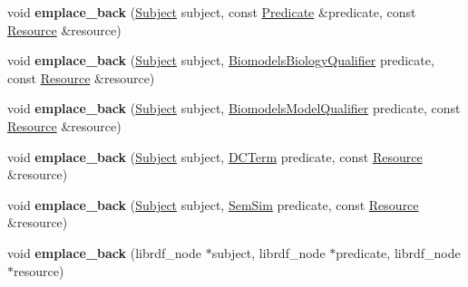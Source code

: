 \begin{DoxyCompactItemize}
\item 
\mbox{\label{classomexmeta_1_1Triples_acab4513889a9a42c77b3044aac941728}} 
void {\bfseries emplace\+\_\+back} (\hyperlink{classomexmeta_1_1Subject}{Subject} subject, const \hyperlink{classomexmeta_1_1Predicate}{Predicate} \&predicate, const \hyperlink{classomexmeta_1_1Resource}{Resource} \&resource)
\item 
\mbox{\label{classomexmeta_1_1Triples_a862d672c0ac9d877261947cf5a7061db}} 
void {\bfseries emplace\+\_\+back} (\hyperlink{classomexmeta_1_1Subject}{Subject} subject, \hyperlink{classomexmeta_1_1BiomodelsBiologyQualifier}{Biomodels\+Biology\+Qualifier} predicate, const \hyperlink{classomexmeta_1_1Resource}{Resource} \&resource)
\item 
\mbox{\label{classomexmeta_1_1Triples_a87cdc3aacef07c2aebbfe06342bd70f5}} 
void {\bfseries emplace\+\_\+back} (\hyperlink{classomexmeta_1_1Subject}{Subject} subject, \hyperlink{classomexmeta_1_1BiomodelsModelQualifier}{Biomodels\+Model\+Qualifier} predicate, const \hyperlink{classomexmeta_1_1Resource}{Resource} \&resource)
\item 
\mbox{\label{classomexmeta_1_1Triples_a9f3f3152592f99ac95f65e0e7ce3b450}} 
void {\bfseries emplace\+\_\+back} (\hyperlink{classomexmeta_1_1Subject}{Subject} subject, \hyperlink{classomexmeta_1_1DCTerm}{D\+C\+Term} predicate, const \hyperlink{classomexmeta_1_1Resource}{Resource} \&resource)
\item 
\mbox{\label{classomexmeta_1_1Triples_a55e7ed1c3212ae19d2189a386b81422e}} 
void {\bfseries emplace\+\_\+back} (\hyperlink{classomexmeta_1_1Subject}{Subject} subject, \hyperlink{classomexmeta_1_1SemSim}{Sem\+Sim} predicate, const \hyperlink{classomexmeta_1_1Resource}{Resource} \&resource)
\item 
\mbox{\label{classomexmeta_1_1Triples_a3a8c150cff4d1e78aa360d62d3d6604e}} 
void {\bfseries emplace\+\_\+back} (librdf\+\_\+node $\ast$subject, librdf\+\_\+node $\ast$predicate, librdf\+\_\+node $\ast$resource)
\item 
\mbox{\label{classomexmeta_1_1Triples_a5234882414a2aaaca603eacd805df3d6}} 

\end{DoxyCompactItemize}
